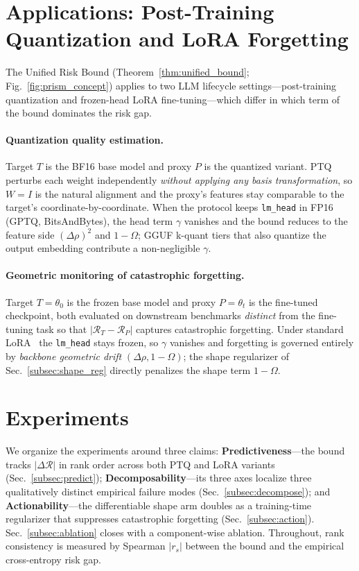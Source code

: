 \documentclass{article}
\begin{document}
\section{Applications: Post-Training Quantization and LoRA Forgetting}
\label{sec:applications}

The Unified Risk Bound (Theorem~\ref{thm:unified_bound}; Fig.~\ref{fig:prism_concept}) applies to two LLM lifecycle settings---post-training quantization and frozen-head LoRA fine-tuning---which differ in which term of the bound dominates the risk gap.

\paragraph{Quantization quality estimation.}
\label{subsec:quantization}
Target $T$ is the BF16 base model and proxy $P$ is the quantized variant. PTQ perturbs each weight independently \emph{without applying any basis transformation}, so $W{=}I$ is the natural alignment and the proxy's features stay comparable to the target's coordinate-by-coordinate. When the protocol keeps \texttt{lm\_head} in FP16 (GPTQ, BitsAndBytes), the head term $\gamma$ vanishes and the bound reduces to the feature side $(\Delta\rho)^2$ and $1{-}\Omega$; GGUF k-quant tiers that also quantize the output embedding contribute a non-negligible $\gamma$.

\paragraph{Geometric monitoring of catastrophic forgetting.}
\label{subsec:forgetting}
Target $T{=}\theta_0$ is the frozen base model and proxy $P{=}\theta_t$ is the fine-tuned checkpoint, both evaluated on downstream benchmarks \emph{distinct} from the fine-tuning task so that $|\mathcal{R}_T - \mathcal{R}_P|$ captures catastrophic forgetting. Under standard LoRA~\cite{hu2022lora} the \texttt{lm\_head} stays frozen, so $\gamma$ vanishes and forgetting is governed entirely by \emph{backbone geometric drift} $(\Delta\rho, 1{-}\Omega)$; the shape regularizer of Sec.~\ref{subsec:shape_reg} directly penalizes the shape term $1{-}\Omega$.


\section{Experiments}
\label{sec:experiments}

We organize the experiments around three claims: \textbf{Predictiveness}---the bound tracks $|\Delta\mathcal{R}|$ in rank order across both PTQ and LoRA variants (Sec.~\ref{subsec:predict}); \textbf{Decomposability}---its three axes localize three qualitatively distinct empirical failure modes (Sec.~\ref{subsec:decompose}); and \textbf{Actionability}---the differentiable shape arm doubles as a training-time regularizer that suppresses catastrophic forgetting (Sec.~\ref{subsec:action}). Sec.~\ref{subsec:ablation} closes with a component-wise ablation. Throughout, rank consistency is measured by Spearman $|r_s|$ between the bound and the empirical cross-entropy risk gap.
\end{document}

